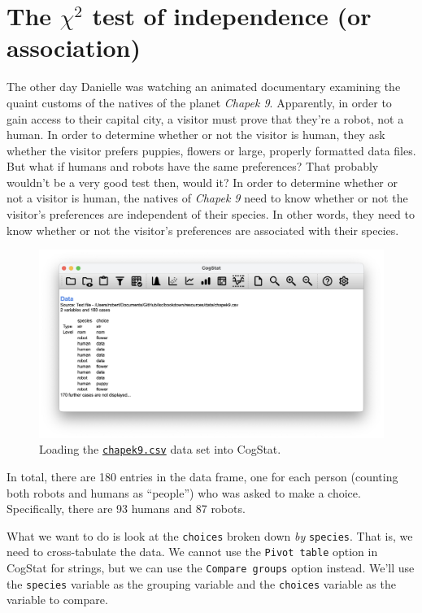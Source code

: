 \documentclass[
]{book}
\theoremstyle{definition}
\theoremstyle{definition}
\theoremstyle{definition}
\theoremstyle{definition}
\theoremstyle{remark}
\begin{document}
\hypertarget{chisqindependence}{%
\section{\texorpdfstring{The \(\chi^2\) test of independence (or association)}{The \textbackslash chi\^{}2 test of independence (or association)}}\label{chisqindependence}}

The other day Danielle was watching an animated documentary examining the quaint customs of the natives of the planet \emph{Chapek 9}. Apparently, in order to gain access to their capital city, a visitor must prove that they're a robot, not a human. In order to determine whether or not the visitor is human, they ask whether the visitor prefers puppies, flowers or large, properly formatted data files. But what if humans and robots have the same preferences? That probably wouldn't be a very good test then, would it? In order to determine whether or not a visitor is human, the natives of \emph{Chapek 9} need to know whether or not the visitor's preferences are independent of their species. In other words, they need to know whether or not the visitor's preferences are associated with their species.



\begin{figure}

{\centering \includegraphics[width=0.66\linewidth]{resources/image/cogstatloadchapek9} 

}

\caption{Loading the \href{resources/data/chapek9.csv}{\texttt{chapek9.csv}} data set into CogStat.}\label{fig:cogstatloadchapek9}
\end{figure}

In total, there are 180 entries in the data frame, one for each person (counting both robots and humans as ``people'') who was asked to make a choice. Specifically, there are 93 humans and 87 robots.

What we want to do is look at the \texttt{choices} broken down \emph{by} \texttt{species}. That is, we need to cross-tabulate the data. We cannot use the \texttt{Pivot\ table} option in CogStat for strings, but we can use the \texttt{Compare\ groups} option instead. We'll use the \texttt{species} variable as the grouping variable and the \texttt{choices} variable as the variable to compare.
\end{document}
